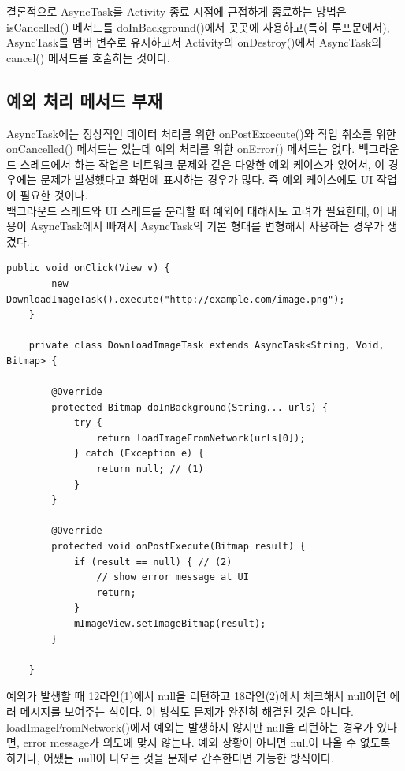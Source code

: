 결론적으로 AsyncTask를 Activity 종료 시점에 근접하게 종료하는 방법은 isCancelled() 메서드를 doInBackground()에서 곳곳에 사용하고(특히 루프문에서), AsyncTask를 멤버 변수로 유지하고서 Activity의 onDestroy()에서 AsyncTask의 cancel() 메서드를 호출하는 것이다.\\


\subsection{예외 처리 메서드 부재} 
AsyncTask에는 정상적인 데이터 처리를 위한 onPostExcecute()와 작업 취소를 위한 onCancelled() 메서드는 있는데 예외 처리를 위한 onError() 메서드는 없다. 
백그라운드 스레드에서 하는 작업은 네트워크 문제와 같은 다양한 예외 케이스가 있어서, 이 경우에는 문제가 발생했다고 화면에 표시하는 경우가 많다. 즉 예외 케이스에도 UI 작업이 필요한 것이다.\\

백그라운드 스레드와 UI 스레드를 분리할 때 예외에 대해서도 고려가 필요한데, 이 내용이 AsyncTask에서 빠져서 AsyncTask의 기본 형태를 변형해서 사용하는 경우가 생겼다.
\begin{lstlisting}[frame=single]
	public void onClick(View v) {
    	new DownloadImageTask().execute("http://example.com/image.png");
	}

	private class DownloadImageTask extends AsyncTask<String, Void, Bitmap> {
	
		@Override
    	protected Bitmap doInBackground(String... urls) {
    		try {
        		return loadImageFromNetwork(urls[0]);
        	} catch (Exception e) {
        		return null; // (1)
        	}
    	}

      	@Override
    	protected void onPostExecute(Bitmap result) {
    		if (result == null) { // (2)
    			// show error message at UI
    			return;
    		}
        	mImageView.setImageBitmap(result);
    	}
    	
	}	
\end{lstlisting}
예외가 발생할 때 12라인(1)에서 null을 리턴하고 18라인(2)에서 체크해서 null이면 에러 메시지를 보여주는 식이다. 이 방식도 문제가 완전히 해결된 것은 아니다. 
loadImageFromNetwork()에서 예외는 발생하지 않지만 null을 리턴하는 경우가 있다면, error message가 의도에 맞지 않는다. 예외 상황이 아니면 null이 나올 수 없도록 하거나, 어쨌든 null이 나오는 것을 문제로 간주한다면 가능한 방식이다. 

